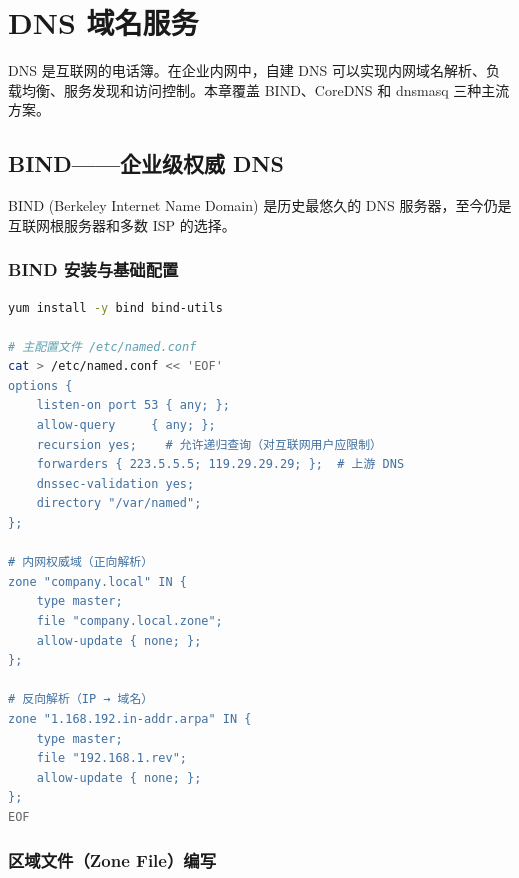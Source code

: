 \documentclass[12pt,UTF8]{ctexbook}
\begin{document}
\chapter{DNS 域名服务}
\label{chap:dns-service}

DNS 是互联网的电话簿。在企业内网中，自建 DNS 可以实现内网域名解析、负载均衡、服务发现和访问控制。本章覆盖 BIND、CoreDNS 和 dnsmasq 三种主流方案。

\section{BIND——企业级权威 DNS}
\label{sec:bind}

BIND (Berkeley Internet Name Domain) 是历史最悠久的 DNS 服务器，至今仍是互联网根服务器和多数 ISP 的选择。

\subsection{BIND 安装与基础配置}

\begin{lstlisting}[language=bash]
yum install -y bind bind-utils

# 主配置文件 /etc/named.conf
cat > /etc/named.conf << 'EOF'
options {
    listen-on port 53 { any; };
    allow-query     { any; };
    recursion yes;    # 允许递归查询（对互联网用户应限制）
    forwarders { 223.5.5.5; 119.29.29.29; };  # 上游 DNS
    dnssec-validation yes;
    directory "/var/named";
};

# 内网权威域（正向解析）
zone "company.local" IN {
    type master;
    file "company.local.zone";
    allow-update { none; };
};

# 反向解析（IP → 域名）
zone "1.168.192.in-addr.arpa" IN {
    type master;
    file "192.168.1.rev";
    allow-update { none; };
};
EOF
\end{lstlisting}

\subsection{区域文件（Zone File）编写}
\end{document}
